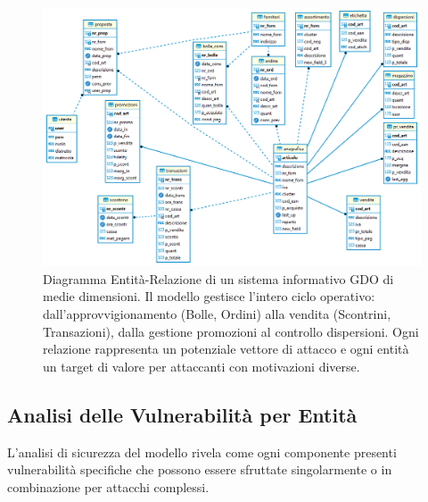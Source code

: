 \begin{figure}[htbp]
\centering
\includegraphics[width=\textwidth]{thesis_figures/cap2/supermark.png}
\caption{Diagramma Entità-Relazione di un sistema informativo GDO di medie dimensioni. Il modello gestisce l'intero ciclo operativo: dall'approvvigionamento (Bolle, Ordini) alla vendita (Scontrini, Transazioni), dalla gestione promozioni al controllo dispersioni. Ogni relazione rappresenta un potenziale vettore di attacco e ogni entità un target di valore per attaccanti con motivazioni diverse.}
\label{fig:database_er}
\end{figure}

\subsection{Analisi delle Vulnerabilità per Entità}
\label{subsec:vulnerabilita_entita}

L'analisi di sicurezza del modello rivela come ogni componente presenti vulnerabilità specifiche che possono essere sfruttate singolarmente o in combinazione per attacchi complessi.


